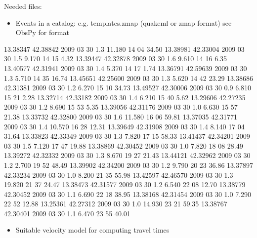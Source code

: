 \documentclass[a4paper,10pt,english]{sphinxmanual}
\begin{document}
Needed files:
\begin{itemize}
\item {} 
Events in a catalog: e.g. templates.zmap (quakeml or zmap format) see ObsPy for format

\end{itemize}
\begin{sphinxalltt}
13.38347        42.38842        2009    03      30      1.3     11.180  14      04      34.50
13.38981        42.33004        2009    03      30      1.5     9.170   14      15      4.32
13.39447        42.32878        2009    03      30      1.6     9.610   14      16      6.35
13.40577        42.31941        2009    03      30      1.4     5.370   14      17      1.74
13.36791        42.59639        2009    03      30      1.3     5.710   14      35      16.74
13.45651        42.25600        2009    03      30      1.3     5.620   14      42      23.29
13.38686        42.31381        2009    03      30      1.2     6.270   15      10      34.73
13.49527        42.30006        2009    03      30      0.9     6.810   15      21      2.28
13.32714        42.33182        2009    03      30      1.4     6.210   15      40      5.62
13.29606        42.27235        2009    03      30      1.2     8.690   15      53      5.35
13.39056        42.31176        2009    03      30      1.0     6.630   15      57      21.38
13.33732        42.32800        2009    03      30      1.6     11.580  16      06      59.81
13.37035        42.31771        2009    03      30      1.4     10.570  16      28      12.31
13.39649        42.31908        2009    03      30      1.4     8.140   17      04      31.64
13.33823        42.33349        2009    03      30      1.3     7.820   17      15      58.33
13.41437        42.34201        2009    03      30      1.5     7.120   17      47      19.88
13.38869        42.30452        2009    03      30      1.0     7.820   18      08      28.49
13.39272        42.32332        2009    03      30      1.3     8.670   19      27      21.43
13.44121        42.32962        2009    03      30      1.2     2.700   19      52      48.49
13.39902        42.34200        2009    03      30      1.2     9.790   20      23      36.86
13.37897        42.33234        2009    03      30      1.0     8.200   21      35      55.98
13.42597        42.46570        2009    03      30      1.3     19.820  21      37      24.47
13.38473        42.31577        2009    03      30      1.2     6.540   22      08      12.70
13.38779        42.30452        2009    03      30      1.1     6.690   22      18      38.95
13.38168        42.31454        2009    03      30      1.0     7.290   22      52      12.88
13.25361        42.27312        2009    03      30      1.0     14.930  23      21      59.35
13.38767        42.30401        2009    03      30      1.1     6.470   23      55      40.01

\end{sphinxalltt}
\begin{itemize}
\item {} 
Suitable velocity model for computing travel times

\end{itemize}
\end{document}
